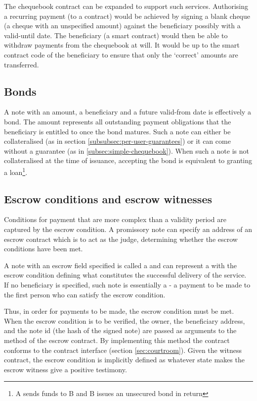 The chequebook contract can be expanded to support such services. Authorising a recurring payment (to a contract) would be achieved by signing a blank cheque (a cheque with an unspecified amount) against the beneficiary possibly with a valid-until date. The beneficiary (a smart contract) would then be able to withdraw payments from the chequebook at will. It would be up to the smart contract code of the beneficiary to ensure that only the `correct' amounts are transferred. 

\subsection{Bonds}

A note with an amount, a beneficiary and a future valid-from date is effectively a bond. The amount represents all outstanding payment obligations that the beneficiary is entitled to once the bond matures. Such a note can either be collateralised (as in section \ref{subsubsec:per-user-guarantees}) or it can come without a guarantee (as in \ref{subsec:simple-chequebook}). When such a note is not collateralised at the time of issuance, accepting the bond is equivalent to granting a loan\footnote{A sends funds to B and B issues an unsecured bond in return}.


\subsection{Escrow conditions and escrow witnesses}

Conditions for payment that are more complex than a validity period are captured by the escrow condition. A promissory note can specify an address of an escrow contract which is to act as the judge, determining whether the escrow conditions have been met.

A note with an escrow field specified is called a  and can represent a  with the escrow condition defining what constitutes the successful delivery of the service. 
If no beneficiary is specified, such note is essentially a  - a payment to be made to the first person who can satisfy the escrow condition. 

Thus, in order for payments to be made, the escrow condition must be met. When the escrow condition is to be verified, the owner, the beneficiary address, and the note id (the hash of the signed note) are passed as arguments to the {} method of the escrow contract. By implementing this method the contract conforms to the  contract  interface (section \ref{sec:courtroom}). Given the witness contract, the escrow condition is implicitly defined as whatever state makes the escrow witness give a positive testimony. 


